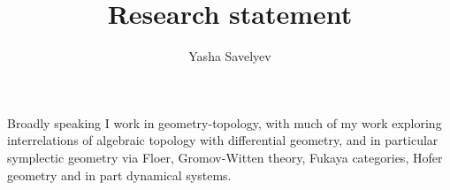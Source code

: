 \documentclass{amsart}
\numberwithin {equation} {section}
\begin{document}
\author{Yasha Savelyev} 
\address{University of Colima, Bernal Díaz del
Castillo 340,
Col. Villas San Sebastian,
28045, Colima, Colima,
Mexico}
\title {Research statement}
\maketitle    
Broadly speaking I work in geometry-topology, 
with much of my work exploring interrelations of 
algebraic topology with differential geometry, and 
in particular symplectic geometry via Floer, 
Gromov-Witten theory, Fukaya categories, Hofer 
geometry and in part dynamical systems.
\end{document}
